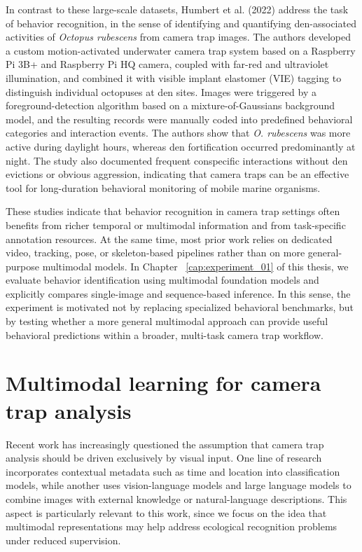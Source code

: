 In contrast to these large-scale datasets, Humbert et al. (2022) \citep{humbert2022associated} address the task of behavior recognition, in the sense of identifying and quantifying den-associated activities of \textit{Octopus rubescens} from camera trap images. The authors developed a custom motion-activated underwater camera trap system based on a Raspberry Pi 3B+ and Raspberry Pi HQ camera, coupled with far-red and ultraviolet illumination, and combined it with visible implant elastomer (VIE) tagging to distinguish individual octopuses at den sites. Images were triggered by a foreground-detection algorithm based on a mixture-of-Gaussians background model, and the resulting records were manually coded into predefined behavioral categories and interaction events. The authors show that \textit{O. rubescens} was more active during daylight hours, whereas den fortification occurred predominantly at night. The study also documented frequent conspecific interactions without den evictions or obvious aggression, indicating that camera traps can be an effective tool for long-duration behavioral monitoring of mobile marine organisms.

These studies indicate that behavior recognition in camera trap settings often benefits from richer temporal or multimodal information and from task-specific annotation resources. At the same time, most prior work relies on dedicated video, tracking, pose, or skeleton-based pipelines rather than on more general-purpose multimodal models. In Chapter ~\ref{cap:experiment_01} of this thesis, we evaluate behavior identification using multimodal foundation models and explicitly compares single-image and sequence-based inference. In this sense, the experiment is motivated not by replacing specialized behavioral benchmarks, but by testing whether a more general multimodal approach can provide useful behavioral predictions within a broader, multi-task camera trap workflow.

\section{Multimodal learning for camera trap analysis}

Recent work has increasingly questioned the assumption that camera trap analysis should be driven exclusively by visual input. One line of research incorporates contextual metadata such as time and location into classification models, while another uses vision-language models and large language models to combine images with external knowledge or natural-language descriptions. This aspect is particularly relevant to this work, since we focus on the idea that multimodal representations may help address ecological recognition problems under reduced supervision.

